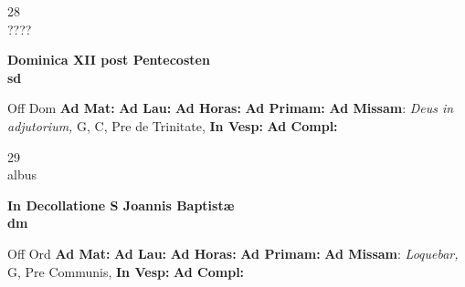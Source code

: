 \documentclass[10pt, openany]{book}
\begin{document}
    \begin{center}
        \begin{minipage}{3.5in}
            \vspace{2em}
            \begin{minipage}{0.5in}
                {\Huge 28} \\
                {\normalsize ????}
            \end{minipage}
            \begin{minipage}{3.0in}
                \textbf{ \large Dominica XII post Pentecosten \\
                \textnormal{\normalsize sd}}

            \end{minipage}
            \begin{justify}Off Dom
                \textbf{Ad Mat: }
                \textbf{Ad Lau: }
                \textbf{Ad Horas: }
                \textbf{Ad Primam: }\textbf{Ad Missam}: \textit{Deus in adjutorium,} G, C, Pre de Trinitate, 
                \textbf{In Vesp: }
                \textbf{Ad Compl: }
            \end{justify}
        \end{minipage}
    \end{center}

    \begin{center}
        \begin{minipage}{3.5in}
            \vspace{2em}
            \begin{minipage}{0.5in}
                {\Huge 29} \\
                {\normalsize albus}
            \end{minipage}
            \begin{minipage}{3.0in}
                \textbf{ \large In Decollatione S Joannis Baptistæ \\
                \textnormal{\normalsize dm}}

            \end{minipage}
            \begin{justify}Off Ord
                \textbf{Ad Mat: }
                \textbf{Ad Lau: }
                \textbf{Ad Horas: }
                \textbf{Ad Primam: }\textbf{Ad Missam}: \textit{Loquebar,} G, Pre Communis, 
                \textbf{In Vesp: }
                \textbf{Ad Compl: }
            \end{justify}
        \end{minipage}
    \end{center}
\end{document}
